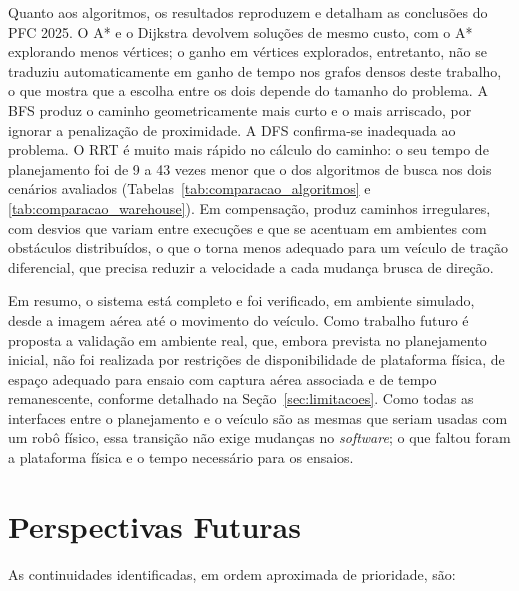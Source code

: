 \documentclass[
    12pt,
    openright,
    oneside,
    a4paper,
    english,
    brazil
]{abntex2}
\begin{document}
Quanto aos algoritmos, os resultados reproduzem e detalham as conclusões do PFC 2025. O A* e o Dijkstra devolvem soluções de mesmo custo, com o A* explorando menos vértices; o ganho em vértices explorados, entretanto, não se traduziu automaticamente em ganho de tempo nos grafos densos deste trabalho, o que mostra que a escolha entre os dois depende do tamanho do problema. A BFS produz o caminho geometricamente mais curto e o mais arriscado, por ignorar a penalização de proximidade. A DFS confirma-se inadequada ao problema. O RRT é muito mais rápido no cálculo do caminho: o seu tempo de planejamento foi de 9 a 43 vezes menor que o dos algoritmos de busca nos dois cenários avaliados (Tabelas~\ref{tab:comparacao_algoritmos} e \ref{tab:comparacao_warehouse}). Em compensação, produz caminhos irregulares, com desvios que variam entre execuções e que se acentuam em ambientes com obstáculos distribuídos, o que o torna menos adequado para um veículo de tração diferencial, que precisa reduzir a velocidade a cada mudança brusca de direção.

Em resumo, o sistema está completo e foi verificado, em ambiente simulado, desde a imagem aérea até o movimento do veículo. Como trabalho futuro é proposta a validação em ambiente real, que, embora prevista no planejamento inicial, não foi realizada por restrições de disponibilidade de plataforma física, de espaço adequado para ensaio com captura aérea associada e de tempo remanescente, conforme detalhado na Seção~\ref{sec:limitacoes}. Como todas as interfaces entre o planejamento e o veículo são as mesmas que seriam usadas com um robô físico, essa transição não exige mudanças no \textit{software}; o que faltou foram a plataforma física e o tempo necessário para os ensaios.

\section{Perspectivas Futuras}
\label{sec:perspectivas}

As continuidades identificadas, em ordem aproximada de prioridade, são:
\end{document}
